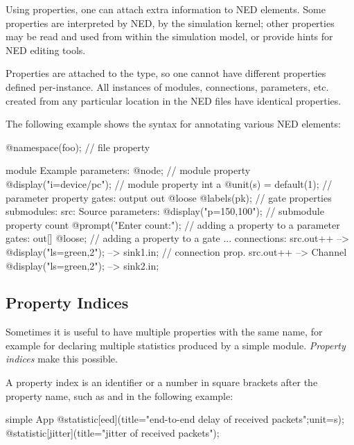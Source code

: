 Using properties, one can attach extra information to NED elements. Some
properties are interpreted by NED, by the simulation kernel; other
properties may be read and used from within the simulation model, or
provide hints for NED editing tools.

Properties are attached to the type, so one cannot have different
properties defined per-instance. All instances of modules, connections,
parameters, etc. created from any particular location in the NED files have
identical properties.

The following example shows the syntax for annotating various NED elements:

\begin{ned}
@namespace(foo);  // file property

module Example
{
    parameters:
       @node;   // module property
       @display("i=device/pc");   // module property
       int a @unit(s) = default(1); // parameter property
    gates:
       output out @loose @labels(pk);  // gate properties
    submodules:
       src: Source {
           parameters:
              @display("p=150,100");  // submodule property
              count @prompt("Enter count:"); // adding a property to a parameter
           gates:
              out[] @loose;  // adding a property to a gate
       }
       ...
    connections:
       src.out++ --> { @display("ls=green,2"); } --> sink1.in; // connection prop.
       src.out++ --> Channel { @display("ls=green,2"); } --> sink2.in;
}
\end{ned}


\subsection{Property Indices}
\label{sec:ned-lang:property-indices}

Sometimes it is useful to have multiple properties with the same name,
for example for declaring multiple statistics produced by a simple module.
\textit{Property indices} make this possible.

A property index is an identifier or a number in square brackets after the
property name, such as  and  in the following example:

\begin{ned}
simple App {
    @statistic[eed](title="end-to-end delay of received packets";unit=s);
    @statistic[jitter](title="jitter of received packets");
}
\end{ned}

